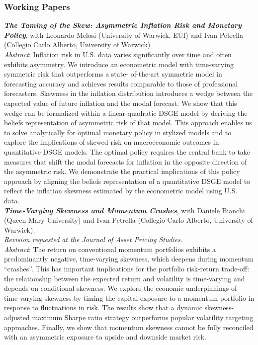 \documentclass[a4paper,12pt]{article}
\begin{document}
\subsubsection*{Working Papers}
\textit{\textbf{The Taming of the Skew: Asymmetric Inflation Risk and Monetary Policy}}, with Leonardo Melosi (University of Warwick, EUI) and Ivan Petrella (Collegio Carlo Alberto, University of Warwick)\\[.5em]
\textit{Abstract}: Inflation risk in U.S. data varies significantly over time and often exhibits asymmetry. We introduce an econometric model with time-varying symmetric risk that outperforms a state-
of-the-art symmetric model in forecasting accuracy and achieves results comparable to those of professional forecasters. Skewness in the inflation distribution introduces a wedge between the expected value of future inflation and the modal forecast. We show that this wedge can be formalized within a linear-quadratic DSGE model by deriving the beliefs representation of asymmetric risk of that model. This approach enables us to solve analytically for optimal monetary policy in stylized models and to explore the implications of skewed risk on macroeconomic outcomes in quantitative DSGE models. The optimal policy requires the central bank to take measures that shift the modal forecasts for inflation in the opposite direction of the asymmetric risk. We demonstrate the practical implications of this policy approach by aligning the beliefs representation of a quantitative DSGE model to reflect the inflation
skewness estimated by the econometric model using U.S. data.\\[.5em]

\textit{\textbf{Time-Varying Skewness and Momentum Crashes}}, with Daniele Bianchi (Queen Mary University) and Ivan Petrella (Collegio Carlo Alberto, University of Warwick).\\\textit{Revision requested at the Journal of Asset Pricing Studies}.\\[.5em]\textit{Abstract}:
The return on conventional momentum portfolios exhibits a predominantly negative, time-varying skewness, which deepens during momentum ``crashes''. This has important implications for the portfolio risk-return trade-off: the relationship between the expected return and volatility is time-varying and depends on conditional skewness. We explore the economic underpinnings of time-varying skewness by timing the capital exposure to a momentum portfolio in response to fluctuations in risk. The results show that a dynamic skewness-adjusted maximum Sharpe ratio strategy outperforms popular volatility targeting approaches. Finally, we show that momentum skewness cannot be fully reconciled with an asymmetric exposure to upside and downside market risk.\\[.5em]
\end{document}
